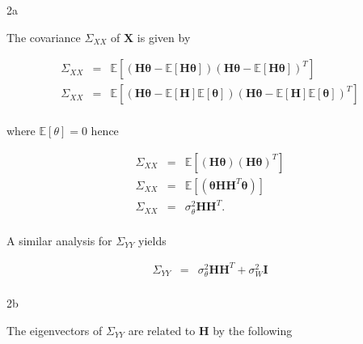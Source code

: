 \documentclass{article}
\begin{document}
\begin{homeworkProblem}

    \begin{homeworkSection}{2a}

        The covariance $\Sigma_{XX}$ of $\bm{X}$ is given by

        \begin{eqnarray*}
            \Sigma_{XX} & = & \mathbb{E}[(\bm{H\theta} -
                                          \mathbb{E}[\bm{H\theta}])
                                         (\bm{H\theta} -
                                          \mathbb{E}[\bm{H\theta}])^T] \\
            \Sigma_{XX} & = & \mathbb{E}[(\bm{H\theta} -
                                  \mathbb{E}[\bm{H}]\mathbb{E}[\bm{\theta}])
                                         (\bm{H\theta} -
                               \mathbb{E}[\bm{H}]\mathbb{E}[\bm{\theta}])^T]\\
        \end{eqnarray*}

        \noindent where $\mathbb{E}[\theta] = 0$ hence

        \begin{eqnarray*}
            \Sigma_{XX} & = & \mathbb{E}[(\bm{H\theta})(\bm{H\theta})^T] \\
            \Sigma_{XX} & = & \mathbb{E}[(\bm{\theta H H}^T \bm{\theta})] \\
            \Sigma_{XX} & = & \sigma_\theta^2 \bm{H H}^T. \\
        \end{eqnarray*}

        A similar analysis for $\Sigma_{YY}$ yields 

        \begin{eqnarray*}
            \Sigma_{YY} & = & \sigma_\theta^2 \bm{H H}^T + \sigma_W^2
            \bm{I}  \\
        \end{eqnarray*}

    \end{homeworkSection}

    \begin{homeworkSection}{2b}

        The eigenvectors of $\Sigma_{YY}$ are related to $\bm{H}$ by the
        following


\end{homeworkSection}
\end{homeworkProblem}
\end{document}
